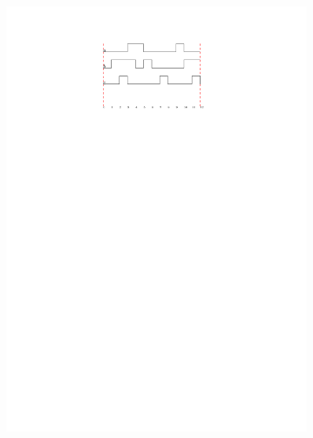 \begin{enumerate}
	\begin{figure}[h]
		\centering
		\includegraphics[width=0.9\textwidth]{fig/Q6.pdf}
		\label{fig:Q6_b}
	\end{figure}
	
\end{enumerate}
